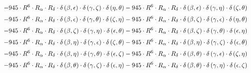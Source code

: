 \begin{subequations}
\begin{gather}
 \\[0.2em] \notag 		 - 945 \cdot R^{6} \cdot R_{\alpha{}} \cdot R_{\delta{}} \cdot \delta{}\left(\beta{}, \epsilon{}\right) \cdot \delta{}\left(\gamma{}, \zeta{}\right) \cdot \delta{}\left(\eta{}, \theta{}\right)- 945 \cdot R^{6} \cdot R_{\alpha{}} \cdot R_{\delta{}} \cdot \delta{}\left(\beta{}, \epsilon{}\right) \cdot \delta{}\left(\gamma{}, \eta{}\right) \cdot \delta{}\left(\zeta{}, \theta{}\right) 
 \\[0.2em] \notag 		 - 945 \cdot R^{6} \cdot R_{\alpha{}} \cdot R_{\delta{}} \cdot \delta{}\left(\beta{}, \epsilon{}\right) \cdot \delta{}\left(\gamma{}, \theta{}\right) \cdot \delta{}\left(\zeta{}, \eta{}\right)- 945 \cdot R^{6} \cdot R_{\alpha{}} \cdot R_{\delta{}} \cdot \delta{}\left(\beta{}, \zeta{}\right) \cdot \delta{}\left(\gamma{}, \epsilon{}\right) \cdot \delta{}\left(\eta{}, \theta{}\right) 
 \\[0.2em] \notag 		 - 945 \cdot R^{6} \cdot R_{\alpha{}} \cdot R_{\delta{}} \cdot \delta{}\left(\beta{}, \zeta{}\right) \cdot \delta{}\left(\gamma{}, \eta{}\right) \cdot \delta{}\left(\epsilon{}, \theta{}\right)- 945 \cdot R^{6} \cdot R_{\alpha{}} \cdot R_{\delta{}} \cdot \delta{}\left(\beta{}, \zeta{}\right) \cdot \delta{}\left(\gamma{}, \theta{}\right) \cdot \delta{}\left(\epsilon{}, \eta{}\right) 
 \\[0.2em] \notag 		 - 945 \cdot R^{6} \cdot R_{\alpha{}} \cdot R_{\delta{}} \cdot \delta{}\left(\beta{}, \eta{}\right) \cdot \delta{}\left(\gamma{}, \epsilon{}\right) \cdot \delta{}\left(\zeta{}, \theta{}\right)- 945 \cdot R^{6} \cdot R_{\alpha{}} \cdot R_{\delta{}} \cdot \delta{}\left(\beta{}, \eta{}\right) \cdot \delta{}\left(\gamma{}, \zeta{}\right) \cdot \delta{}\left(\epsilon{}, \theta{}\right) 
 \\[0.2em] \notag 		 - 945 \cdot R^{6} \cdot R_{\alpha{}} \cdot R_{\delta{}} \cdot \delta{}\left(\beta{}, \eta{}\right) \cdot \delta{}\left(\gamma{}, \theta{}\right) \cdot \delta{}\left(\epsilon{}, \zeta{}\right)- 945 \cdot R^{6} \cdot R_{\alpha{}} \cdot R_{\delta{}} \cdot \delta{}\left(\beta{}, \theta{}\right) \cdot \delta{}\left(\gamma{}, \epsilon{}\right) \cdot \delta{}\left(\zeta{}, \eta{}\right) 
 \\[0.2em] \notag 		 - 945 \cdot R^{6} \cdot R_{\alpha{}} \cdot R_{\delta{}} \cdot \delta{}\left(\beta{}, \theta{}\right) \cdot \delta{}\left(\gamma{}, \zeta{}\right) \cdot \delta{}\left(\epsilon{}, \eta{}\right)- 945 \cdot R^{6} \cdot R_{\alpha{}} \cdot R_{\delta{}} \cdot \delta{}\left(\beta{}, \theta{}\right) \cdot \delta{}\left(\gamma{}, \eta{}\right) \cdot \delta{}\left(\epsilon{}, \zeta{}\right) 

\end{gather}
\end{subequations}
